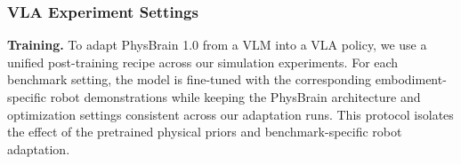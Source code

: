 \documentclass{llmxive}
\providecommand{\paragraph}[1]{\noindent\textbf{#1.}\hspace*{1em}}
\begin{document}
\subsubsection{VLA Experiment Settings}

\paragraph{Training}
To adapt PhysBrain 1.0 from a VLM into a VLA policy, we use a unified post-training recipe across our simulation experiments. For each benchmark setting, the model is fine-tuned with the corresponding embodiment-specific robot demonstrations while keeping the PhysBrain architecture and optimization settings consistent across our adaptation runs. This protocol isolates the effect of the pretrained physical priors and benchmark-specific robot adaptation.
\end{document}
